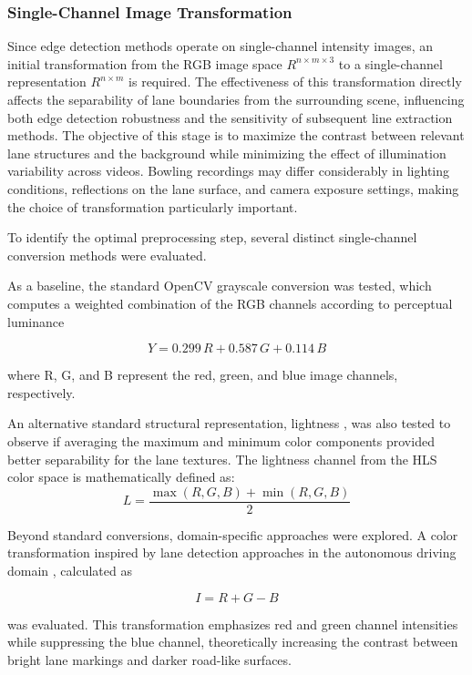 \subsubsection{Single-Channel Image Transformation}
Since edge detection methods operate on single-channel intensity images, an initial transformation from the RGB image space ${R}^{n\times m\times 3}$ to a single-channel representation ${R}^{n\times m}$ is required. The effectiveness of this transformation directly affects the separability of lane boundaries from the surrounding scene, influencing both edge detection robustness and the sensitivity of subsequent line extraction methods.
The objective of this stage is to maximize the contrast between relevant lane structures and the background while minimizing the effect of illumination variability across videos. Bowling recordings may differ considerably in lighting conditions, reflections on the lane surface, and camera exposure settings, making the choice of transformation particularly important.

To identify the optimal preprocessing step, several distinct single-channel conversion methods were evaluated.

As a baseline, the standard OpenCV grayscale conversion was tested, which computes a weighted combination of the RGB channels according to perceptual luminance \cite{opencv2018colorconversions,gonzalez2008digital}  

\begin{equation}
Y = 0.299\,R + 0.587\,G + 0.114\,B
\end{equation}

where R, G, and B represent the red, green, and blue image channels, respectively.

An alternative standard structural representation, lightness \cite{opencv2018colorconversions}, was also tested to observe if averaging the maximum and minimum color components provided better separability for the lane textures. The lightness channel from the HLS color space is mathematically defined as:
$$L = \frac{\max(R, G, B) + \min(R, G, B)}{2}$$

Beyond standard conversions, domain-specific approaches were explored. A color transformation inspired by lane detection approaches in the autonomous driving domain \cite{wu2014lanemark}, calculated as

\begin{equation}
I = R + G - B
\end{equation}

was evaluated. This transformation emphasizes red and green channel intensities while suppressing the blue channel, theoretically increasing the contrast between bright lane markings and darker road-like surfaces.

